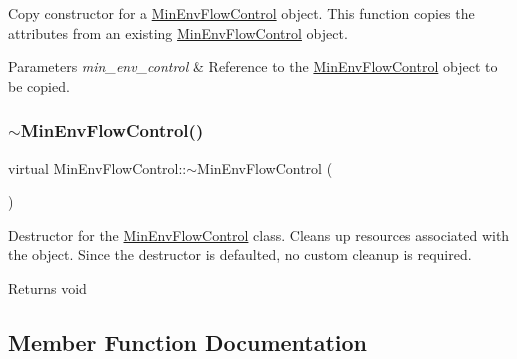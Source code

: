 Copy constructor for a {\ttfamily \mbox{\hyperlink{classMinEnvFlowControl}{Min\+Env\+Flow\+Control}}} object. This function copies the attributes from an existing {\ttfamily \mbox{\hyperlink{classMinEnvFlowControl}{Min\+Env\+Flow\+Control}}} object. 


\begin{DoxyParams}{Parameters}
{\em min\+\_\+env\+\_\+control} & Reference to the {\ttfamily \mbox{\hyperlink{classMinEnvFlowControl}{Min\+Env\+Flow\+Control}}} object to be copied. \\
\hline
\end{DoxyParams}
\mbox{\label{classMinEnvFlowControl_a3a5f44703a5a0cdeb48c948af397137d}} 
\subsubsection{\texorpdfstring{$\sim$\+Min\+Env\+Flow\+Control()}{~MinEnvFlowControl()}}
{\footnotesize\ttfamily virtual Min\+Env\+Flow\+Control\+::$\sim$\+Min\+Env\+Flow\+Control (\begin{DoxyParamCaption}{ }\end{DoxyParamCaption})\hspace{0.3cm}{\ttfamily [virtual]}}



Destructor for the {\ttfamily \mbox{\hyperlink{classMinEnvFlowControl}{Min\+Env\+Flow\+Control}}} class. Cleans up resources associated with the object. Since the destructor is defaulted, no custom cleanup is required. 

\begin{DoxyReturn}{Returns}
void 
\end{DoxyReturn}


\subsection{Member Function Documentation}
\mbox{\label{classMinEnvFlowControl_a4f849e1385f68c9d8f2835889f14a71f}} 
